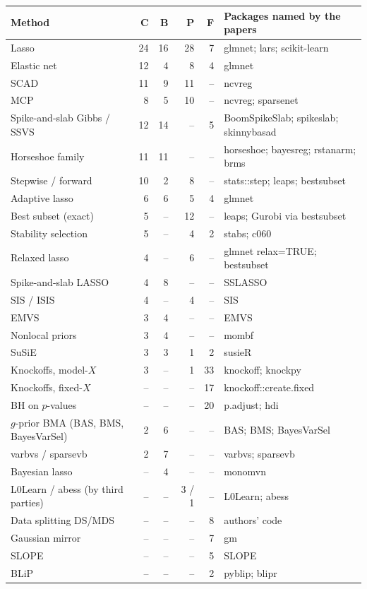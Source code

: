\documentclass[11pt,letterpaper]{article}
\begin{document}
\begin{center}\small
\begin{tabular}{@{}lrrrrl@{}}
\toprule
Method & C & B & P & F & Packages named by the papers \\
\midrule
Lasso & 24 & 16 & 28 & 7 & glmnet; lars; scikit-learn \\
Elastic net & 12 & 4 & 8 & 4 & glmnet \\
SCAD & 11 & 9 & 11 & -- & ncvreg \\
MCP & 8 & 5 & 10 & -- & ncvreg; sparsenet \\
Spike-and-slab Gibbs / SSVS & 12 & 14 & -- & 5 & BoomSpikeSlab; spikeslab; skinnybasad \\
Horseshoe family & 11 & 11 & -- & -- & horseshoe; bayesreg; rstanarm; brms \\
Stepwise / forward & 10 & 2 & 8 & -- & stats::step; leaps; bestsubset \\
Adaptive lasso & 6 & 6 & 5 & 4 & glmnet \\
Best subset (exact) & 5 & -- & 12 & -- & leaps; Gurobi via bestsubset \\
Stability selection & 5 & -- & 4 & 2 & stabs; c060 \\
Relaxed lasso & 4 & -- & 6 & -- & glmnet relax=TRUE; bestsubset \\
Spike-and-slab LASSO & 4 & 8 & -- & -- & SSLASSO \\
SIS / ISIS & 4 & -- & 4 & -- & SIS \\
EMVS & 3 & 4 & -- & -- & EMVS \\
Nonlocal priors & 3 & 4 & -- & -- & mombf \\
SuSiE & 3 & 3 & 1 & 2 & susieR \\
Knockoffs, model-$X$ & 3 & -- & 1 & 33 & knockoff; knockpy \\
Knockoffs, fixed-$X$ & -- & -- & -- & 17 & knockoff::create.fixed \\
BH on $p$-values & -- & -- & -- & 20 & p.adjust; hdi \\
$g$-prior BMA (BAS, BMS, BayesVarSel) & 2 & 6 & -- & -- & BAS; BMS; BayesVarSel \\
varbvs / sparsevb & 2 & 7 & -- & -- & varbvs; sparsevb \\
Bayesian lasso & -- & 4 & -- & -- & monomvn \\
L0Learn / abess (by third parties) & -- & -- & 3 / 1 & -- & L0Learn; abess \\
Data splitting DS/MDS & -- & -- & -- & 8 & authors' code \\
Gaussian mirror & -- & -- & -- & 7 & gm \\
SLOPE & -- & -- & -- & 5 & SLOPE \\
BLiP & -- & -- & -- & 2 & pyblip; blipr \\
\bottomrule
\end{tabular}
\end{center}
\end{document}
